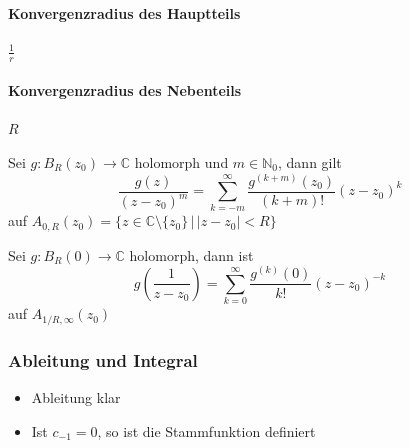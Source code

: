 \paragraph{Konvergenzradius des Hauptteils} $\frac{1}{r}$
\paragraph{Konvergenzradius des Nebenteils} $R$

\begin{sectionbox}
    Sei $g:B_R(z_0)\rightarrow\mathbb C$ holomorph und $m\in\mathbb N_0$, dann gilt
    \begin{equation*}
        \frac{g(z)}{(z-z_0)^m}=\sum_{k=-m}^{\infty}\frac{g^{(k+m)}(z_0)}{(k+m)!}(z-z_0)^k
    \end{equation*}
    auf $A_{0,R}(z_0)=\{z\in\mathbb C\setminus\{z_0\} \, | \, |z-z_0| < R\}$
\end{sectionbox}

\begin{sectionbox}
    Sei $g:B_R(0)\rightarrow\mathbb C$ holomorph, dann ist
    \begin{equation*}
        g\left(\frac{1}{z-z_0}\right)=\sum_{k=0}^\infty \frac{g^{(k)}(0)}{k!}(z-z_0)^{-k}
    \end{equation*}
    auf $A_{1/R,\infty}(z_0)$
\end{sectionbox}

\begin{sectionbox}
    \subsubsection{Ableitung und Integral}
    \begin{itemize}
        \item Ableitung klar
        \item Ist $c_{-1}=0$, so ist die Stammfunktion definiert
    \end{itemize}
\end{sectionbox}


